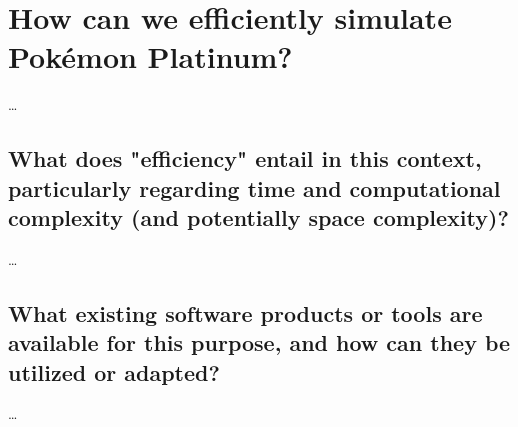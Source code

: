 \section{How can we efficiently simulate Pokémon Platinum?}
\dots

\subsection{What does "efficiency" entail in this context, particularly regarding time and computational complexity (and potentially space complexity)?}
\dots

\subsection{What existing software products or tools are available for this purpose, and how can they be utilized or adapted?}
\dots